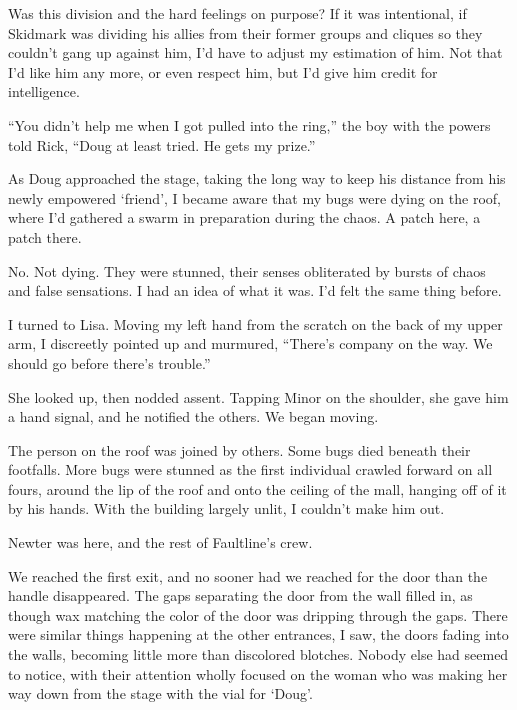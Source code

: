 Was this division and the hard feelings on purpose?  If it was intentional, if Skidmark was dividing his allies from their former groups and cliques so they couldn't gang up against him, I'd have to adjust my estimation of him.  Not that I'd like him any more, or even respect him, but I'd give him credit for intelligence.



``You didn't help me when I got pulled into the ring,'' the boy with the powers told Rick, ``Doug at least tried.  He gets my prize.''



As Doug approached the stage, taking the long way to keep his distance from his newly empowered `friend', I became aware that my bugs were dying on the roof, where I'd gathered a swarm in preparation during the chaos.  A patch here, a patch there.



No.  Not dying.  They were stunned, their senses obliterated by bursts of chaos and false sensations.  I had an idea of what it was.  I'd felt the same thing before.



I turned to Lisa.  Moving my left hand from the scratch on the back of my upper arm, I discreetly pointed up and murmured, ``There's company on the way.  We should go before there's trouble.''



She looked up, then nodded assent.  Tapping Minor on the shoulder, she gave him a hand signal, and he notified the others.  We began moving.



The person on the roof was joined by others.  Some bugs died beneath their footfalls.  More bugs were stunned as the first individual crawled forward on all fours, around the lip of the roof and onto the ceiling of the mall, hanging off of it by his hands.  With the building largely unlit, I couldn't make him out.



Newter was here, and the rest of Faultline's crew.



We reached the first exit, and no sooner had we reached for the door than the handle disappeared.  The gaps separating the door from the wall filled in, as though wax matching the color of the door was dripping through the gaps.  There were similar things happening at the other entrances, I saw, the doors fading into the walls, becoming little more than discolored blotches.  Nobody else had seemed to notice, with their attention wholly focused on the woman who was making her way down from the stage with the vial for `Doug'.



